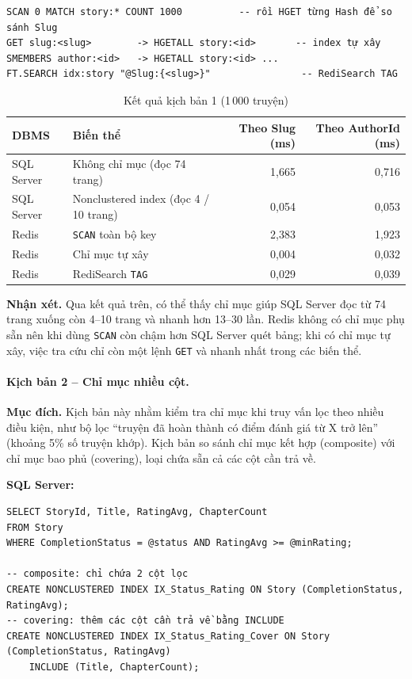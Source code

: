 \begin{verbatim}
SCAN 0 MATCH story:* COUNT 1000          -- rồi HGET từng Hash để so sánh Slug
GET slug:<slug>        -> HGETALL story:<id>       -- index tự xây
SMEMBERS author:<id>   -> HGETALL story:<id> ...
FT.SEARCH idx:story "@Slug:{<slug>}"                -- RediSearch TAG
\end{verbatim}

\begin{table}[H]
\centering\small
\begin{tabular}{|l|l|r|r|}
\hline
\textbf{DBMS} & \textbf{Biến thể} & \textbf{Theo Slug (ms)} & \textbf{Theo AuthorId (ms)} \\ \hline
SQL Server & Không chỉ mục (đọc 74 trang) & 1,665 & 0,716 \\ \hline
SQL Server & Nonclustered index (đọc 4 / 10 trang) & 0,054 & 0,053 \\ \hline
Redis & \texttt{SCAN} toàn bộ key & 2,383 & 1,923 \\ \hline
Redis & Chỉ mục tự xây & 0,004 & 0,032 \\ \hline
Redis & RediSearch \texttt{TAG} & 0,029 & 0,039 \\ \hline
\end{tabular}
\caption{Kết quả kịch bản 1 (1\,000 truyện)}
\label{tab:idx-i1}
\end{table}

\textbf{Nhận xét.} Qua kết quả trên, có thể thấy chỉ mục giúp SQL Server đọc từ 74 trang xuống còn 4--10 trang và nhanh hơn 13--30 lần. Redis không có chỉ mục phụ sẵn nên khi dùng \texttt{SCAN} còn chậm hơn SQL Server quét bảng; khi có chỉ mục tự xây, việc tra cứu chỉ còn một lệnh \texttt{GET} và nhanh nhất trong các biến thể.

\paragraph{Kịch bản 2 -- Chỉ mục nhiều cột.}

\textbf{Mục đích.} Kịch bản này nhằm kiểm tra chỉ mục khi truy vấn lọc theo nhiều điều kiện, như bộ lọc ``truyện đã hoàn thành có điểm đánh giá từ X trở lên'' (khoảng 5\% số truyện khớp). Kịch bản so sánh chỉ mục kết hợp (composite) với chỉ mục bao phủ (covering), loại chứa sẵn cả các cột cần trả về.

\textbf{SQL Server:}

\begin{verbatim}
SELECT StoryId, Title, RatingAvg, ChapterCount
FROM Story
WHERE CompletionStatus = @status AND RatingAvg >= @minRating;

-- composite: chỉ chứa 2 cột lọc
CREATE NONCLUSTERED INDEX IX_Status_Rating ON Story (CompletionStatus, RatingAvg);
-- covering: thêm các cột cần trả về bằng INCLUDE
CREATE NONCLUSTERED INDEX IX_Status_Rating_Cover ON Story (CompletionStatus, RatingAvg)
    INCLUDE (Title, ChapterCount);
\end{verbatim}

